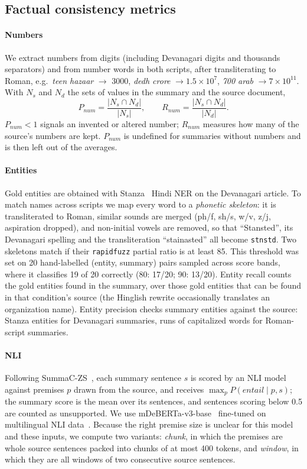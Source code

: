 \subsection{Factual consistency metrics}

\paragraph{Numbers}
We extract numbers from digits (including Devanagari digits and thousands separators) and from number words in both scripts, after transliterating to Roman, e.g.\ \emph{teen hazaar} $\to$ 3000, \emph{dedh crore} $\to 1.5\times10^7$, \emph{700 arab} $\to 7\times10^{11}$. With $N_s$ and $N_d$ the sets of values in the summary and the source document,
\begin{equation}
P_{num} = \frac{|N_s \cap N_d|}{|N_s|}, \qquad R_{num} = \frac{|N_s \cap N_d|}{|N_d|}.
\end{equation}
$P_{num} < 1$ signals an invented or altered number; $R_{num}$ measures how many of the source's numbers are kept. $P_{num}$ is undefined for summaries without numbers and is then left out of the averages.

\paragraph{Entities}
Gold entities are obtained with Stanza~\cite{qi2020stanza} Hindi NER on the Devanagari article. To match names across scripts we map every word to a \emph{phonetic skeleton}: it is transliterated to Roman, similar sounds are merged (ph/f, sh/s, w/v, z/j, aspiration dropped), and non-initial vowels are removed, so that ``Stansted'', its Devanagari spelling and the transliteration ``stainasted'' all become \texttt{stnstd}. Two skeletons match if their \texttt{rapidfuzz} partial ratio is at least 85. This threshold was set on 20 hand-labelled (entity, summary) pairs sampled across score bands, where it classifies 19 of 20 correctly (80: 17/20; 90: 13/20). Entity recall counts the gold entities found in the summary, over those gold entities that can be found in that condition's source (the Hinglish rewrite occasionally translates an organization name). Entity precision checks summary entities against the source: Stanza entities for Devanagari summaries, runs of capitalized words for Roman-script summaries.

\paragraph{NLI}
Following SummaC-ZS~\cite{laban2022summac}, each summary sentence $s$ is scored by an NLI model against premises $p$ drawn from the source, and receives $\max_p P(\textit{entail}\mid p, s)$; the summary score is the mean over its sentences, and sentences scoring below 0.5 are counted as unsupported. We use mDeBERTa-v3-base~\cite{he2023debertav3} fine-tuned on multilingual NLI data~\cite{laurer2024less}. Because the right premise size is unclear for this model and these inputs, we compute two variants: \emph{chunk}, in which the premises are whole source sentences packed into chunks of at most 400 tokens, and \emph{window}, in which they are all windows of two consecutive source sentences.

